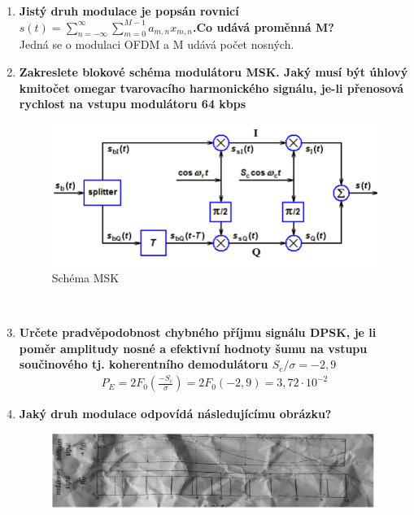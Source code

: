 \begin{enumerate}
{    signál je \(f(t) = sin(2\pi \cdot 103t)\) [V]}
    \begin{gather*}
        n = \frac{f_n - f_c}{F_{max}} = \frac{10,003\cdot 10^6 - 10\cdot 10^6}{10^3} = 3\\
        S_3 = S_c \left | J_3(\beta) \right | = 5\cdot \left | J_3(5) \right | = 0,68V
    \end{gather*}
    \item \textbf{Jistý druh modulace je popsán rovnicí \(s(t) = \sum_{n = -\infty}^{\infty} \sum_{m=0}^{M-1}a_{m,n}x_{m,n}\).Co udává proměnná
    M?}\\
    Jedná se o modulaci OFDM a M udává počet nosných.
    \item \textbf{Zakreslete blokové schéma modulátoru MSK. Jaký musí být úhlový kmitočet omegar
    tvarovacího harmonického signálu, je-li přenosová rychlost na vstupu modulátoru 64 kbps}
    \begin{figure}[h]
        \centering
        \includegraphics[scale = 0.3]{images/MSK.png}
        \caption{Schéma MSK}
    \end{figure}\\
    \item \textbf{Určete pradvěpodobnost chybného příjmu signálu DPSK, je li poměr amplitudy nosné a
    efektivní hodnoty šumu na vstupu součinového tj. koherentního demodulátoru \(S_c/\sigma
    =-2,9\)}
    \begin{gather*}
        P_E = 2F_0(\frac{-S_c}{\sigma}) = 2F_0(-2,9) = 3,72\cdot 10^{-2}
    \end{gather*}
    \item \textbf{Jaký druh modulace odpovídá následujícímu obrázku?}\\
    \begin{figure}[h]
        \centering
        \includegraphics[scale = 0.3]{images/PWMAsy.png}

\end{figure}
\end{enumerate}
